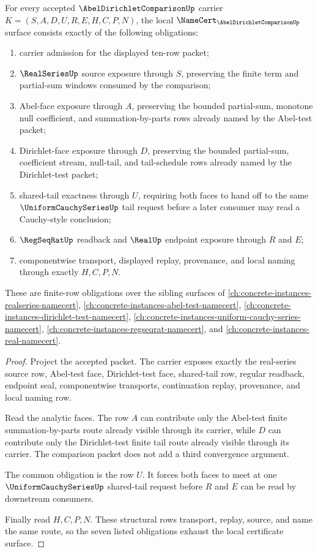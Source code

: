 \begin{theorem}
\label{thm:abel-dirichlet-comparison-namecert-obligations}
For every accepted $\AbelDirichletComparisonUp$ carrier $K=(S,A,D,U,R,E,H,C,P,N)$, the local $\NameCert_{\AbelDirichletComparisonUp}$ surface consists exactly of the following obligations:
\begin{enumerate}
\item carrier admission for the displayed ten-row packet;
\item $\RealSeriesUp$ source exposure through $S$, preserving the finite term and partial-sum windows consumed by the comparison;
\item Abel-face exposure through $A$, preserving the bounded partial-sum, monotone null coefficient, and summation-by-parts rows already named by the Abel-test packet;
\item Dirichlet-face exposure through $D$, preserving the bounded partial-sum, coefficient stream, null-tail, and tail-schedule rows already named by the Dirichlet-test packet;
\item shared-tail exactness through $U$, requiring both faces to hand off to the same $\UniformCauchySeriesUp$ tail request before a later consumer may read a Cauchy-style conclusion;
\item $\RegSeqRatUp$ readback and $\RealUp$ endpoint exposure through $R$ and $E$;
\item componentwise transport, displayed replay, provenance, and local naming through exactly $H,C,P,N$.
\end{enumerate}
These are finite-row obligations over the sibling surfaces of \autoref{ch:concrete-instances-realseries-namecert}, \autoref{ch:concrete-instances-abel-test-namecert}, \autoref{ch:concrete-instances-dirichlet-test-namecert}, \autoref{ch:concrete-instances-uniform-cauchy-series-namecert}, \autoref{ch:concrete-instances-regseqrat-namecert}, and \autoref{ch:concrete-instances-real-namecert}.
\end{theorem}
\begin{proof}
Project the accepted packet. The carrier exposes exactly the real-series source row, Abel-test face, Dirichlet-test face, shared-tail row, regular readback, endpoint seal, componentwise transports, continuation replay, provenance, and local naming row.

Read the analytic faces. The row $A$ can contribute only the Abel-test finite summation-by-parts route already visible through its carrier, while $D$ can contribute only the Dirichlet-test finite tail route already visible through its carrier. The comparison packet does not add a third convergence argument.

The common obligation is the row $U$. It forces both faces to meet at one $\UniformCauchySeriesUp$ shared-tail request before $R$ and $E$ can be read by downstream consumers.

Finally read $H,C,P,N$. These structural rows transport, replay, source, and name the same route, so the seven listed obligations exhaust the local certificate surface.
\end{proof}

